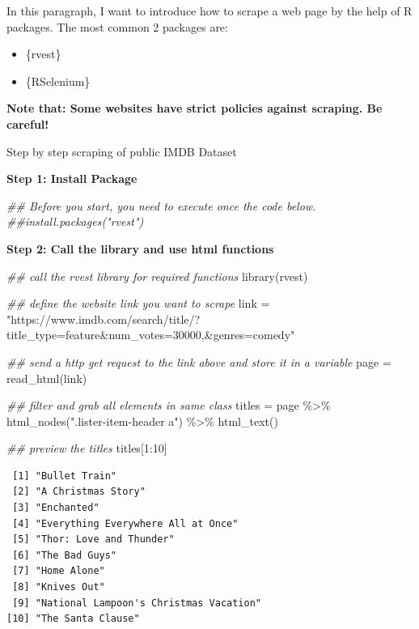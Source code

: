 \documentclass[
  letterpaper,
  DIV=11,
  numbers=noendperiod]{scrreprt}
\newenvironment{Shaded}{\begin{snugshade}}{\end{snugshade}}
\newcommand{\DecValTok}[1]{\textcolor[rgb]{0.68,0.00,0.00}{#1}}
\newcommand{\DocumentationTok}[1]{\textcolor[rgb]{0.37,0.37,0.37}{\textit{#1}}}
\newcommand{\FunctionTok}[1]{\textcolor[rgb]{0.28,0.35,0.67}{#1}}
\newcommand{\NormalTok}[1]{\textcolor[rgb]{0.00,0.23,0.31}{#1}}
\newcommand{\OtherTok}[1]{\textcolor[rgb]{0.00,0.23,0.31}{#1}}
\newcommand{\SpecialCharTok}[1]{\textcolor[rgb]{0.37,0.37,0.37}{#1}}
\newcommand{\StringTok}[1]{\textcolor[rgb]{0.13,0.47,0.30}{#1}}
\providecommand{\tightlist}{%
  \setlength{\itemsep}{0pt}\setlength{\parskip}{0pt}}\usepackage{longtable,booktabs,array}
\begin{document}
In this paragraph, I want to introduce how to scrape a web page by the
help of R packages. The most common 2 packages are:

\begin{itemize}
\tightlist
\item
  \{rvest\}
\item
  \{RSelenium\}
\end{itemize}

\textbf{Note that: Some websites have strict policies against scraping.
Be careful!}

Step by step scraping of public IMDB Dataset

\textbf{Step 1: Install Package}

\begin{Shaded}
\begin{Highlighting}[]
\DocumentationTok{\#\# Before you start, you need to execute once the code below.}
\DocumentationTok{\#\#install.packages("rvest")}
\end{Highlighting}
\end{Shaded}

\textbf{Step 2: Call the library and use html functions}

\begin{Shaded}
\begin{Highlighting}[]
\DocumentationTok{\#\# call the rvest library for required functions}
\FunctionTok{library}\NormalTok{(rvest)}

\DocumentationTok{\#\# define the website link you want to scrape}
\NormalTok{link }\OtherTok{=} \StringTok{"https://www.imdb.com/search/title/?title\_type=feature\&num\_votes=30000,\&genres=comedy"}

\DocumentationTok{\#\# send a http get request to the link above and store it in a variable}
\NormalTok{page }\OtherTok{=} \FunctionTok{read\_html}\NormalTok{(link)}

\DocumentationTok{\#\# filter and grab all elements in same class}
\NormalTok{titles }\OtherTok{=}\NormalTok{ page }\SpecialCharTok{\%\textgreater{}\%} \FunctionTok{html\_nodes}\NormalTok{(}\StringTok{".lister{-}item{-}header a"}\NormalTok{) }\SpecialCharTok{\%\textgreater{}\%} \FunctionTok{html\_text}\NormalTok{()}

\DocumentationTok{\#\# preview the titles}
\NormalTok{titles[}\DecValTok{1}\SpecialCharTok{:}\DecValTok{10}\NormalTok{]}
\end{Highlighting}
\end{Shaded}

\begin{verbatim}
 [1] "Bullet Train"                         
 [2] "A Christmas Story"                    
 [3] "Enchanted"                            
 [4] "Everything Everywhere All at Once"    
 [5] "Thor: Love and Thunder"               
 [6] "The Bad Guys"                         
 [7] "Home Alone"                           
 [8] "Knives Out"                           
 [9] "National Lampoon's Christmas Vacation"
[10] "The Santa Clause"                     
\end{verbatim}
\end{document}
